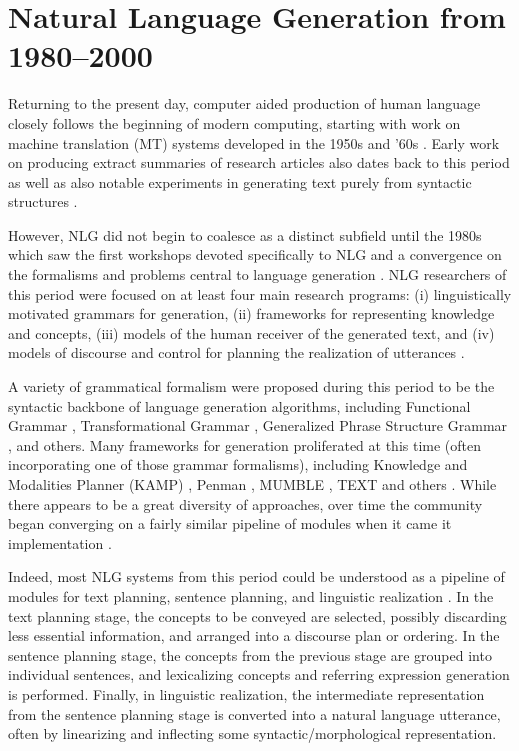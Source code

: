 \section{Natural Language Generation from 1980--2000}
  
Returning to the present day, computer aided production of human language
closely follows the beginning of modern computing, starting with work on
machine translation (MT) systems developed in the 1950s and '60s
\citep{ornstein1955mechanical,national1966language,hutchins2003machine}. Early
work on producing extract summaries of research articles also dates back to
this period \citep{luhn1958automatic} as well as  also notable experiments in
generating text purely from syntactic structures \citep{yngve1961random}.
  
However, NLG did not begin to coalesce as a distinct subfield until the 1980s
which saw the first workshops devoted specifically to NLG  and a convergence
on the formalisms and problems central to language generation
\citep{reiter1997building,mcdonald2010natural}.  NLG researchers of this
period were focused on at least four main research programs: (i)
linguistically motivated grammars for generation, (ii) frameworks for
representing knowledge and concepts, (iii) models of the human receiver of the
generated text, and (iv) models of discourse and control for planning the
realization of utterances \citep{mann1981text,mckeown1986}. 
    
A variety of grammatical formalism were proposed during this period to be the
syntactic backbone of language generation algorithms, including Functional
Grammar \citep{halliday2013halliday}, Transformational Grammar
\citep{chomsky1965aspects}, Generalized Phrase Structure Grammar
\citep{gazdar1985generalized}, and others. Many frameworks for generation
proliferated at this time (often incorporating one of those grammar
formalisms), including Knowledge and Modalities Planner (KAMP)
\citep{appelt1982planning}, Penman \citep{hovy1993natural}, MUMBLE
\citep{McDonald1981MUMBLEAF}, TEXT \citep{mckeown1982text} and others
\citep{mann1981text}.  While there appears to be a great diversity of
approaches, over time the community began converging on a fairly similar
pipeline of modules when it came it implementation \citep{reiter1994has}. 
  
Indeed, most NLG systems from this period could be understood as a pipeline of
modules for text planning, sentence planning, and linguistic realization
\citep{reiter1997building}.  In the text planning stage, the concepts to be
conveyed are selected, possibly discarding less essential information, and
arranged into a discourse plan or ordering. In the sentence planning stage,
the concepts from the previous stage are grouped into individual sentences,
and lexicalizing concepts and referring expression generation is performed.
Finally, in linguistic realization, the intermediate representation from the
sentence planning stage is converted into a natural language utterance, often
by linearizing and inflecting some syntactic/morphological representation.
  
